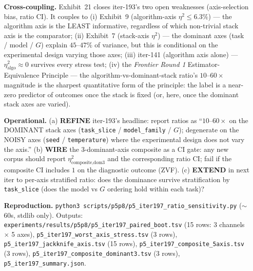 \textbf{Cross-coupling.}
Exhibit~21 closes iter-193's two open weaknesses (axis-selection bias,
ratio CI). It couples to (i) Exhibit~9 (algorithm-axis $\eta^2 \le 6.3\%$)
--- the algorithm axis is the LEAST informative, regardless of which
non-trivial stack axis is the comparator; (ii) Exhibit~7 (stack-axis
$\eta^2$) --- the dominant axes (task / model / $G$) explain $45$--$47\%$
of variance, but this is conditional on the experimental design varying
those axes; (iii) iter-141 (algorithm axis alone) --- $\eta^2_\text{algo} \approx 0$ survives every stress test; (iv) the \emph{Frontier
Round 1} Estimator-Equivalence Principle --- the algorithm-vs-dominant-stack
ratio's $10$--$60\times$ magnitude is the sharpest quantitative form of
the principle: the label is a near-zero predictor of outcomes once the
stack is fixed (or, here, once the dominant stack axes are varied).

\textbf{Operational.} (a) \textbf{REFINE} iter-193's headline: report
ratios as ``$10$--$60\times$ on the DOMINANT stack axes
(\texttt{task\_slice} / \texttt{model\_family} / $G$); degenerate on
the NOISY axes (\texttt{seed} / \texttt{temperature}) where the
experimental design does not vary the axis.'' (b) \textbf{WIRE} the
3-dominant-axis composite as a CI gate: any new corpus should report
$\eta^2_{\text{composite},\text{dom3}}$ and the corresponding ratio CI;
fail if the composite CI includes $1$ on the diagnostic outcome
(\textsc{ZVF}). (c) \textbf{EXTEND} in next iter to per-axis stratified
ratio: does the dominance survive stratification by \texttt{task\_slice}
(does the model vs $G$ ordering hold within each task)?

\textbf{Reproduction.}
\texttt{python3 scripts/p5p8/p5\_iter197\_ratio\_sensitivity.py}
($\sim$60s, stdlib only). Outputs:
\texttt{experiments/results/p5p8/p5\_iter197\_paired\_boot.tsv}
(15 rows: 3 channels $\times$ 5 axes),
\texttt{p5\_iter197\_worst\_axis\_stress.tsv} (3 rows),
\texttt{p5\_iter197\_jackknife\_axis.tsv} (15 rows),
\texttt{p5\_iter197\_composite\_5axis.tsv} (3 rows),
\texttt{p5\_iter197\_composite\_dominant3.tsv} (3 rows),
\texttt{p5\_iter197\_summary.json}.
